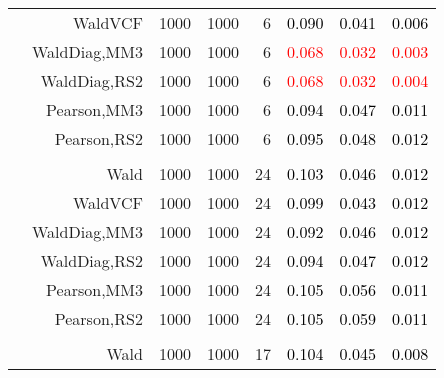 \documentclass[
]{article}
\begin{document}
\begin{table}[H]
{\begin{tabular}[t]{lrrrrrrr}
\hspace{1em} & WaldVCF & 1000 & 1000 & 6 & \textcolor{black}{0.090} & \textcolor{black}{0.041} & \textcolor{black}{0.006}\\

\hspace{1em} & WaldDiag,MM3 & 1000 & 1000 & 6 & \textcolor{red}{0.068} & \textcolor{red}{0.032} & \textcolor{red}{0.003}\\

\hspace{1em} & WaldDiag,RS2 & 1000 & 1000 & 6 & \textcolor{red}{0.068} & \textcolor{red}{0.032} & \textcolor{red}{0.004}\\

\hspace{1em} & Pearson,MM3 & 1000 & 1000 & 6 & \textcolor{black}{0.094} & \textcolor{black}{0.047} & \textcolor{black}{0.011}\\

\hspace{1em} & Pearson,RS2 & 1000 & 1000 & 6 & \textcolor{black}{0.095} & \textcolor{black}{0.048} & \textcolor{black}{0.012}\\
\cmidrule{1-8}
\addlinespace[0.3em]
\multicolumn{8}{l}{\textbf{1F 15V}}\\
\hspace{1em} & Wald & 1000 & 1000 & 24 & \textcolor{black}{0.103} & \textcolor{black}{0.046} & \textcolor{black}{0.012}\\

\hspace{1em} & WaldVCF & 1000 & 1000 & 24 & \textcolor{black}{0.099} & \textcolor{black}{0.043} & \textcolor{black}{0.012}\\

\hspace{1em} & WaldDiag,MM3 & 1000 & 1000 & 24 & \textcolor{black}{0.092} & \textcolor{black}{0.046} & \textcolor{black}{0.012}\\

\hspace{1em} & WaldDiag,RS2 & 1000 & 1000 & 24 & \textcolor{black}{0.094} & \textcolor{black}{0.047} & \textcolor{black}{0.012}\\

\hspace{1em} & Pearson,MM3 & 1000 & 1000 & 24 & \textcolor{black}{0.105} & \textcolor{black}{0.056} & \textcolor{black}{0.011}\\

\hspace{1em} & Pearson,RS2 & 1000 & 1000 & 24 & \textcolor{black}{0.105} & \textcolor{black}{0.059} & \textcolor{black}{0.011}\\
\cmidrule{1-8}
\addlinespace[0.3em]
\multicolumn{8}{l}{\textbf{2F 10V}}\\
\hspace{1em} & Wald & 1000 & 1000 & 17 & \textcolor{black}{0.104} & \textcolor{black}{0.045} & \textcolor{black}{0.008}\\


\end{tabular}}
\end{table}
\end{document}
